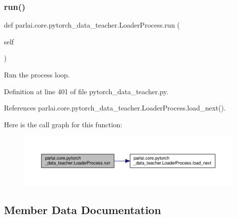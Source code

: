 \subsubsection{\texorpdfstring{run()}{run()}}
{\footnotesize\ttfamily def parlai.\+core.\+pytorch\+\_\+data\+\_\+teacher.\+Loader\+Process.\+run (\begin{DoxyParamCaption}\item[{}]{self }\end{DoxyParamCaption})}

\begin{DoxyVerb}Run the process loop.\end{DoxyVerb}
 

Definition at line 401 of file pytorch\+\_\+data\+\_\+teacher.\+py.



References parlai.\+core.\+pytorch\+\_\+data\+\_\+teacher.\+Loader\+Process.\+load\+\_\+next().

Here is the call graph for this function\+:
\nopagebreak
\begin{figure}[H]
\begin{center}
\leavevmode
\includegraphics[width=350pt]{classparlai_1_1core_1_1pytorch__data__teacher_1_1LoaderProcess_a741c7edb04daec4d8623987b3de4406a_cgraph}
\end{center}
\end{figure}


\subsection{Member Data Documentation}
\mbox{\label{classparlai_1_1core_1_1pytorch__data__teacher_1_1LoaderProcess_ab2a63c11685407b16bd14c02605901c2}} 
